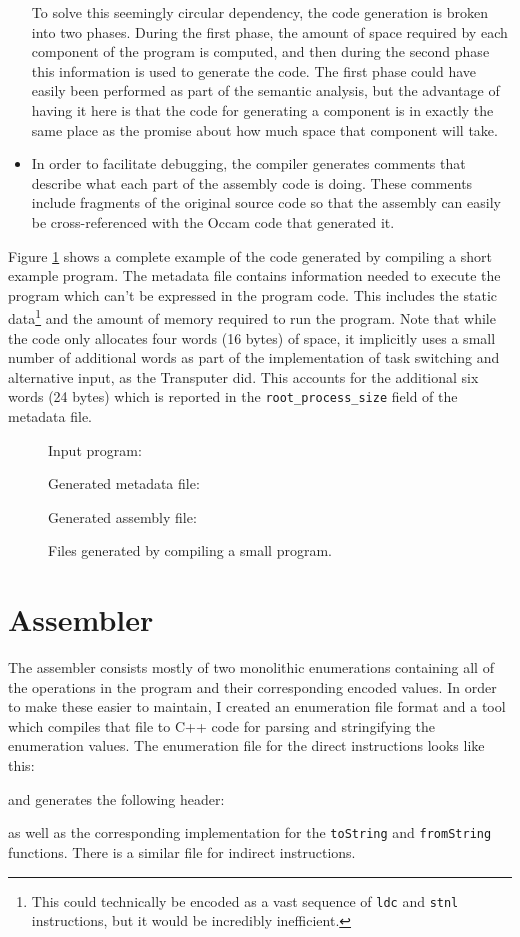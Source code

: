 \begin{itemize}
    To solve this seemingly circular dependency, the code generation is broken
    into two phases. During the first phase, the amount of space required by
    each component of the program is computed, and then during the second phase
    this information is used to generate the code. The first phase could have
    easily been performed as part of the semantic analysis, but the advantage of
    having it here is that the code for generating a component is in exactly the
    same place as the promise about how much space that component will take.
  \item
    In order to facilitate debugging, the compiler generates comments that
    describe what each part of the assembly code is doing. These comments
    include fragments of the original source code so that the assembly can
    easily be cross-referenced with the Occam code that generated it.
\end{itemize}

Figure \ref{code-example} shows a complete example of the code generated by
compiling a short example program. The metadata file contains information needed
to execute the program which can't be expressed in the program code. This
includes the static data\footnote{This could technically be encoded as a vast
sequence of \texttt{ldc} and \texttt{stnl} instructions, but it would be
incredibly inefficient.} and the amount of memory required to run the program.
Note that while the code only allocates four words (16 bytes) of space, it
implicitly uses a small number of additional words as part of the implementation
of task switching and alternative input, as the Transputer did. This accounts
for the additional six words (24 bytes) which is reported in the
\texttt{root\_process\_size} field of the metadata file.

\begin{figure}[p]
  \label{code-example}
  Input program:
  
  Generated metadata file:
  
  Generated assembly file:
  
  \caption{Files generated by compiling a small program.}
\end{figure}

\section{Assembler} \label{assembler}

The assembler consists mostly of two monolithic enumerations containing all of
the operations in the program and their corresponding encoded values. In order
to make these easier to maintain, I created an enumeration file format and
a tool which compiles that file to C++ code for parsing and stringifying the
enumeration values. The enumeration file for the direct instructions looks like
this:

and generates the following header:

as well as the corresponding implementation for the \texttt{toString} and
\texttt{fromString} functions. There is a similar file for indirect
instructions.

